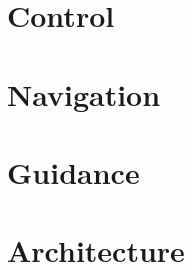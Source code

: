 \documentclass{article}
\begin{document}

\clearpage
\section{Control}


\clearpage
\section{Navigation}


\clearpage
\section{Guidance}


\clearpage
\section{Architecture}

\end{document}
